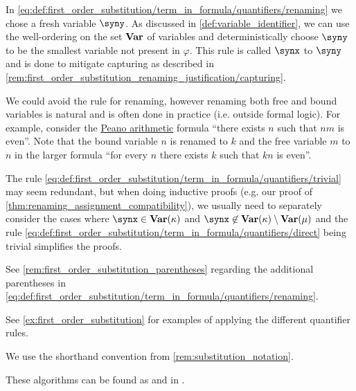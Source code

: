 \begin{comments}
  \item In \eqref{eq:def:first_order_substitution/term_in_formula/quantifiers/renaming} we chose a fresh variable \( \syny \). As discussed in \cref{def:variable_identifier}, we can use the well-ordering on the set \( \op*{Var} \) of variables and deterministically choose \( \syny \) to be the smallest variable not present in \( \varphi \). This rule is called  \( \synx \) to \( \syny \) and is done to mitigate capturing as described in \cref{rem:first_order_substitution_renaming_justification/capturing}.

  \item We could avoid the rule for renaming, however renaming both free and bound variables is natural and is often done in practice (i.e. outside formal logic). For example, consider the \hyperref[def:peano_arithmetic]{Peano arithmetic} formula \enquote{there exists \( n \) such that \( nm \) is even}. Note that the bound variable \( n \) is renamed to \( k \) and the free variable \( m \) to \( n \) in the larger formula \enquote{for every \( n \) there exists \( k \) such that \( kn \) is even}.

  \item The rule \eqref{eq:def:first_order_substitution/term_in_formula/quantifiers/trivial} may seem redundant, but when doing inductive proofs (e.g. our proof of \cref{thm:renaming_assignment_compatibility}), we usually need to separately consider the cases where \( \synx \in \op*{Var}(\kappa) \) and \( \synx \not\in \op*{Var}(\kappa) \setminus \op*{Var}(\mu) \) and the rule \eqref{eq:def:first_order_substitution/term_in_formula/quantifiers/direct} being trivial simplifies the proofs.

  \item See \cref{rem:first_order_substitution_parentheses} regarding the additional parentheses in \eqref{eq:def:first_order_substitution/term_in_formula/quantifiers/renaming}.

  \item See \cref{ex:first_order_substitution} for examples of applying the different quantifier rules.

  \item We use the shorthand convention from \cref{rem:substitution_notation}.

  \item These algorithms can be found as  and  in \cite{notebook:code}.
\end{comments}

